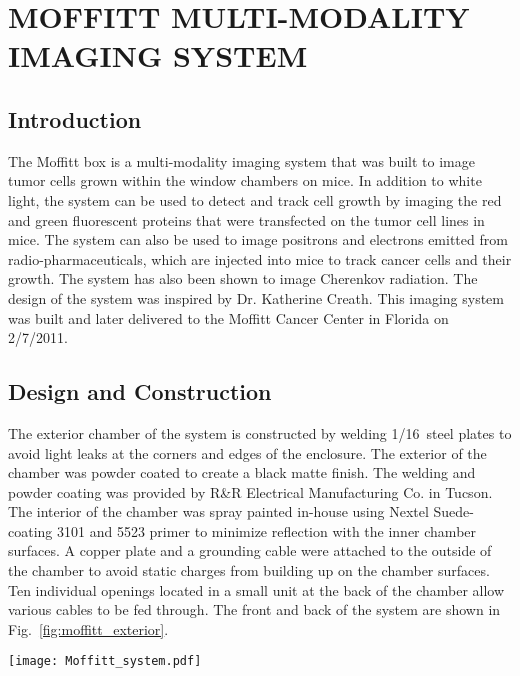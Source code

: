 \chapter{MOFFITT MULTI-MODALITY IMAGING SYSTEM}\label{app:moffitt}

\section{Introduction}
The Moffitt box is a multi-modality imaging system that was built to image tumor cells grown within the window chambers on mice.  In addition to white light, the system can be used to detect and track cell growth by imaging the red and green fluorescent proteins that were transfected on the tumor cell lines in mice.  The system can also be used to image positrons and electrons emitted from radio-pharmaceuticals, which are injected into mice to track cancer cells and their growth.  The system has also been shown to image Cherenkov radiation.  The design of the system was inspired by Dr. Katherine Creath.  This imaging system was built and later delivered to the Moffitt Cancer Center in Florida on 2/7/2011.

\section{Design and Construction}
The exterior chamber of the system is constructed by welding 1/16\inches~steel plates to avoid light leaks at the corners and edges of the enclosure. The exterior of the chamber was powder coated to create a black matte finish.  The welding and powder coating was provided by R\&R  Electrical Manufacturing Co. in Tucson.  The interior of the chamber was spray painted in-house using Nextel Suede-coating 3101 and 5523 primer to minimize reflection with the inner chamber surfaces.  A copper plate and a grounding cable were attached to the outside of the chamber to avoid static charges from building up on the chamber surfaces.  Ten individual openings located in a small unit at the back of the chamber allow various cables to be fed through.  The front and back of the system are shown in Fig.~\ref{fig:moffitt_exterior}.

\begin{sidewaysfigure*}
	\centering
	\texttt{[image: Moffitt\_system.pdf]}
	\caption{The (a) front and (b) back of the Moffitt imaging system.}
	\label{fig:moffitt_exterior}
\end{sidewaysfigure*}

